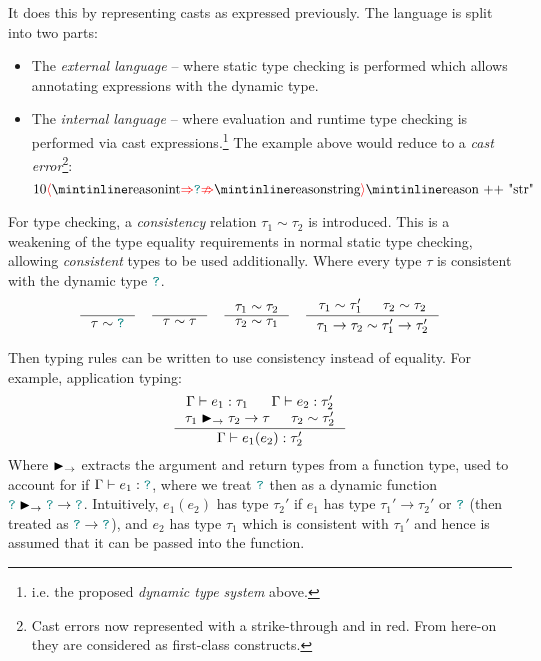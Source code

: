 It does this by representing casts as expressed previously. The language is split into two parts:
\begin{itemize}
\item The \textit{external language} -- where static type checking is performed which allows annotating expressions with the dynamic type.
\item The \textit{internal language} -- where evaluation and runtime type checking is performed via cast expressions.\footnote{i.e. the proposed \textit{dynamic type system} above.} The example above would reduce to a \textit{cast error}\footnote{Cast errors now represented with a strike-through and in red. From here-on they are considered as first-class constructs.}: \[10\scasterror{\code{int}}{\code{string}}\code{ ++ "str"}\]
\end{itemize}
For type checking, a \textit{consistency} relation $\tau_1 \sim \tau_2$ is introduced. This is a weakening of the type equality requirements in normal static type checking, allowing \textit{consistent} types to be used additionally. Where every type $\tau$ is consistent with the dynamic type ${\color{teal}\texttt{?}}$.
\[\inference{}{\tau \sim \dyn} \quad \inference{}{\tau \sim \tau} \quad \inference{\tau_1 \sim \tau_2}{\tau_2 \sim \tau_1} \quad \inference{\tau_1 \sim \tau_1' & \tau_2 \sim \tau_2}{\tau_1 \to \tau_2 \sim \tau_1' \to \tau_2'}\]

Then typing rules can be written to use consistency instead of equality. For example, application typing:
\[\inference{\Gamma \vdash e_1 : \tau_1 & \Gamma \vdash e_2 : \tau_2'\\ \tau_1 \funmatch \tau_2 \to \tau & \tau_2 \sim \tau_2'}{\Gamma \vdash e_1(e_2) : \tau_2'}\]
Where $\blacktriangleright_\rightarrow$ extracts the argument and return types from a function type, used to account for if $\Gamma \vdash e_1 : {\color{teal}\texttt{?}}$, where we treat ${\color{teal}\texttt{?}}$ then as a dynamic function ${\color{teal}\texttt{?}} \blacktriangleright_\rightarrow {\color{teal}\texttt{?}} \to {\color{teal}\texttt{?}}$.
Intuitively, $e_1(e_2)$ has type $\tau_2'$ if $e_1$ has type $\tau_1' \to \tau_2'$ or ${\color{teal}\texttt{?}}$ (then treated as ${\color{teal}\texttt{?}} \to {\color{teal}\texttt{?}}$), and $e_2$ has type $\tau_1$ which is consistent with $\tau_1'$ and hence is assumed that it can be passed into the function.

